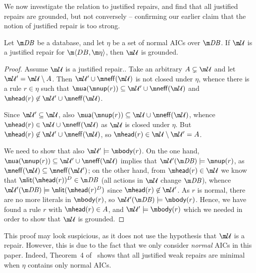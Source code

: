 We now investigate the relation to justified repairs, and find that all justified repairs are grounded, but not conversely -- confirming our earlier claim that the notion of justified repair is too strong.

\begin{lemma}
  \label{lem:justified}
  Let $\db$ be a database, and let $\eta$ be a set of normal AICs over $\db$. If $\UU$ is a justified repair for $\fulldb$, then $\UU$ is grounded.
\end{lemma}
\begin{proof}
 Assume $\UU$ is a justified repair.. 
  Take an arbitrary $A \subsetneq \UU$ and let $\UU'=\UU\setminus A$. 
  Then $\UU'\cup\neff(\UU)$ is not closed under $\eta$, whence there is a rule $r\in\eta$ such that $\actof(\nup(r))\subseteq\UU'\cup\neff(\UU)$ and $\head(r)\not\in\UU'\cup\neff(\UU)$.

  Since $\UU'\subseteq\UU$, also $\actof(\nup(r))\subseteq\UU\cup\neff(\UU)$, whence $\head(r)\in\UU\cup\neff(\UU)$ as $\UU$ is closed under $\eta$.
  But $\head(r)\not\in\UU'\cup\neff(\UU)$, so $\head(r)\in\UU\setminus\UU' = A $.

  We need to show that also $\UU'\models\body(r)$. On the one hand, $\actof(\nup(r))\subseteq\UU'\cup\neff(\UU)$ implies that $\UU'(\db)\models\nup(r)$, as $\neff(\UU)\subseteq\neff(\UU')$; on the other hand, from $\head(r)\in\UU$ we know that $\litof(\head(r))^D\in\db$ (all actions in $\UU$ change $\db$), whence $\UU'(\db)\models\litof(\head(r)^D)$ since $\head(r)\not\in\UU'$.
  As $r$ is normal, there are no more literals in $\body(r)$, so $\UU'(\db)\models\body(r)$. 
  Hence, we have found a rule $r$ with $\head(r)\in A$, and $\UU'\models \body(r)$ which we needed in order to show that $\UU$ is grounded. %
% 
\end{proof}
This proof may look suspicious, as it does not use the hypothesis that $\UU$ is a repair.
However, this is due to the fact that we only consider \emph{normal} AICs in this paper. Indeed, Theorem~4 of~\cite{tplp/CaropreseT11} shows that all justified weak repairs are minimal when $\eta$ contains only normal AICs.




